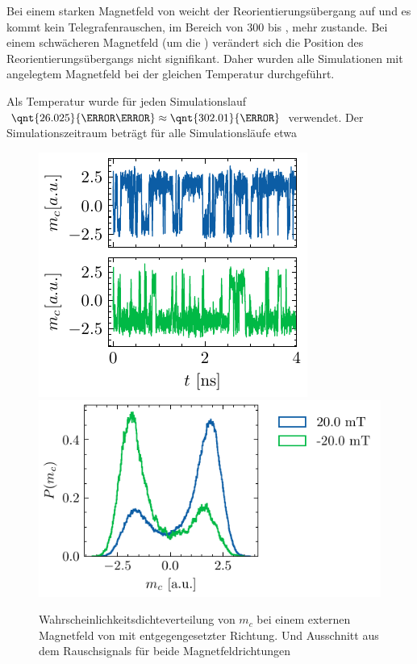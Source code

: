 \documentclass[main.tex]{subfiles}
\begin{document}
Bei einem starken Magnetfeld von  weicht der Reorientierungsübergang auf und es kommt kein Telegrafenrauschen, im Bereich von \num{300} bis , mehr zustande. Bei einem schwächeren Magnetfeld (um die ) verändert sich die Position des Reorientierungsübergangs nicht signifikant. Daher wurden alle Simulationen mit angelegtem Magnetfeld bei der gleichen Temperatur durchgeführt.

Als Temperatur wurde für jeden Simulationslauf \( \qnt{26.025}{\milli\electronvolt} \approx \qnt{302.01}{\kelvin}\) verwendet.
Der Simulationszeitraum beträgt für alle Simulationsläufe etwa 

\begin{figure}[H]
    \centering
    \includegraphics{bilder/plots/Bz_sign_comparison/20mT_t_comp.pdf}
    \includegraphics{bilder/plots/Bz_sign_comparison/20mT_hist_comp.pdf}
    \caption{Wahrscheinlichkeitsdichteverteilung von \(m_c\) bei einem externen Magnetfeld von  mit entgegengesetzter Richtung. Und Ausschnitt aus dem Rauschsignals für beide Magnetfeldrichtungen }\label{fig:bc-sign-hist}
\end{figure}
\end{document}
